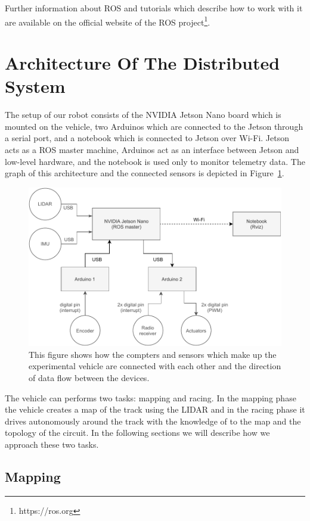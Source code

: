 Further information about ROS and tutorials which describe how to work with it are available on the official website of the ROS project\footnote{https://ros.org}.

\section{Architecture Of The Distributed System}

The setup of our robot consists of the NVIDIA Jetson Nano board which is mounted on the vehicle, two Arduinos which are connected to the Jetson through a serial port, and a notebook which is connected to Jetson over Wi-Fi. Jetson acts as a ROS master machine, Arduinos act as an interface between Jetson and low-level hardware, and the notebook is used only to monitor telemetry data. The graph of this architecture and the connected sensors is depicted in Figure~\ref{fig:ros_diagram}.

\begin{figure}[]\centering
\includegraphics[width=125mm]{../img/ros_diagram.pdf}
\caption{This figure shows how the compters and sensors which make up the experimental vehicle are connected with each other and the direction of data flow between the devices.}
\label{fig:ros_diagram}
\end{figure}

The vehicle can performs two tasks: mapping and racing. In the mapping phase the vehicle creates a map of the track using the LIDAR and in the racing phase it drives autonomously around the track with the knowledge of to the map and the topology of the circuit. In the following sections we will describe how we approach these two tasks.

\subsection{Mapping}

